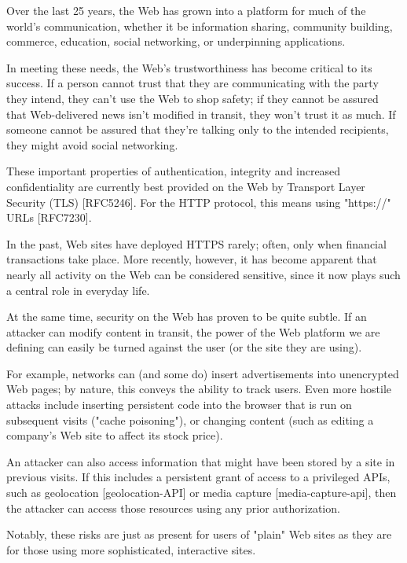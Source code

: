 \begin{introduction}

\color{blue}

Over the last 25 years, the Web has grown into a platform for much of the world’s communication, whether it be information sharing, community building, commerce, education, social networking, or underpinning applications.

In meeting these needs, the Web’s trustworthiness has become critical to its success. If a person cannot trust that they are communicating with the party they intend, they can’t use the Web to shop safety; if they cannot be assured that Web-delivered news isn’t modified in transit, they won’t trust it as much. If someone cannot be assured that they’re talking only to the intended recipients, they might avoid social networking.

These important properties of authentication, integrity and increased confidentiality are currently best provided on the Web by Transport Layer Security (TLS) [RFC5246]. For the HTTP protocol, this means using "https://" URLs [RFC7230].

In the past, Web sites have deployed HTTPS rarely; often, only when financial transactions take place. More recently, however, it has become apparent that nearly all activity on the Web can be considered sensitive, since it now plays such a central role in everyday life.

At the same time, security on the Web has proven to be quite subtle. If an attacker can modify content in transit, the power of the Web platform we are defining can easily be turned against the user (or the site they are using).

For example, networks can (and some do) insert advertisements into unencrypted Web pages; by nature, this conveys the ability to track users. Even more hostile attacks include inserting persistent code into the browser that is run on subsequent visits ("cache poisoning"), or changing content (such as editing a company's Web site to affect its stock price).

An attacker can also access information that might have been stored by a site in previous visits. If this includes a persistent grant of access to a privileged APIs, such as geolocation [geolocation-API] or media capture [media-capture-api], then the attacker can access those resources using any prior authorization.

Notably, these risks are just as present for users of "plain" Web sites as they are for those using more sophisticated, interactive sites.


\end{introduction}
